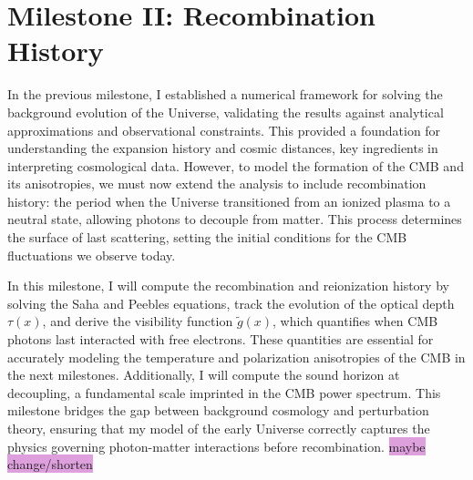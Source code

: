 \documentclass{aa}
\begin{document}
\section{Milestone II: Recombination History}\label{sec: milestone II}
In the previous milestone, I established a numerical framework for solving the background evolution of the Universe, validating the results against analytical approximations and observational constraints. This provided a foundation for understanding the expansion history and cosmic distances, key ingredients in interpreting cosmological data. However, to model the formation of the CMB and its anisotropies, we must now extend the analysis to include recombination history: the period when the Universe transitioned from an ionized plasma to a neutral state, allowing photons to decouple from matter. This process determines the surface of last scattering, setting the initial conditions for the CMB fluctuations we observe today.  

In this milestone, I will compute the recombination and reionization history by solving the Saha and Peebles equations, track the evolution of the optical depth $\tau(x)$, and derive the visibility function $\tilde{g}(x)$, which quantifies when CMB photons last interacted with free electrons. These quantities are essential for accurately modeling the temperature and polarization anisotropies of the CMB in the next milestones. Additionally, I will compute the sound horizon at decoupling, a fundamental scale imprinted in the CMB power spectrum. This milestone bridges the gap between background cosmology and perturbation theory, ensuring that my model of the early Universe correctly captures the physics governing photon-matter interactions before recombination. \colorbox{Plum}{maybe change/shorten}
\end{document}

